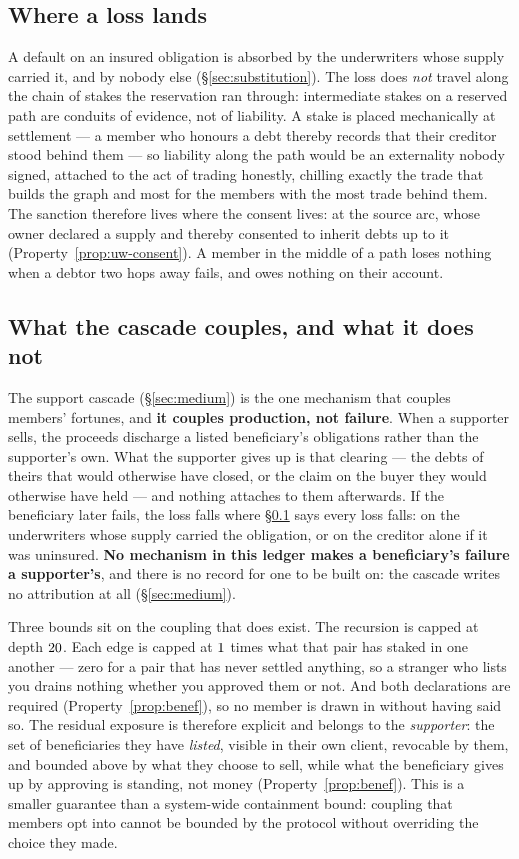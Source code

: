 \subsection{Where a loss lands}
\label{sec:loss-lands}

A default on an insured obligation is absorbed by the underwriters whose supply carried
it, and by nobody else (\S\ref{sec:substitution}). The loss does \emph{not} travel along
the chain of stakes the reservation ran through: intermediate stakes on a reserved path
are conduits of evidence, not of liability. A stake is placed mechanically at settlement
--- a member who honours a debt thereby records that their creditor stood behind them ---
so liability along the path would be an externality nobody signed, attached to the act of
trading honestly, chilling exactly the trade that builds the graph and most for the members
with the most trade behind them. The sanction therefore lives where the consent lives: at
the source arc, whose owner declared a supply and thereby consented to inherit debts up to
it (Property~\ref{prop:uw-consent}). A member in the middle of a path loses nothing when a
debtor two hops away fails, and owes nothing on their account.

\subsection{What the cascade couples, and what it does not}

The support cascade (\S\ref{sec:medium}) is the one mechanism that couples members'
fortunes, and \textbf{it couples production, not failure}. When a supporter sells, the
proceeds discharge a listed beneficiary's obligations rather than the supporter's own.
What the supporter gives up is that clearing --- the debts of theirs that would otherwise
have closed, or the claim on the buyer they would otherwise have held --- and nothing
attaches to them afterwards. If the beneficiary later fails, the loss falls where
\S\ref{sec:loss-lands} says every loss falls: on the underwriters whose supply carried the
obligation, or on the creditor alone if it was uninsured. \textbf{No mechanism in this
ledger makes a beneficiary's failure a supporter's}, and there is no record for one to be
built on: the cascade writes no attribution at all (\S\ref{sec:medium}).

Three bounds sit on the coupling that does exist. The recursion is capped at depth
$20$. Each edge is capped at $1$ times what that pair has
staked in one another --- zero for a pair that has never settled anything, so a stranger
who lists you drains nothing whether you approved them or not. And both declarations are
required (Property~\ref{prop:benef}), so no member is drawn in without having said so.
The residual exposure is therefore explicit and belongs to the \emph{supporter}: the set
of beneficiaries they have \emph{listed}, visible in their own client, revocable by them,
and bounded above by what they choose to sell, while what the beneficiary gives up by
approving is standing, not money (Property~\ref{prop:benef}). This is a smaller guarantee
than a system-wide containment bound: coupling that members opt into cannot be bounded by
the protocol without overriding the choice they made.

